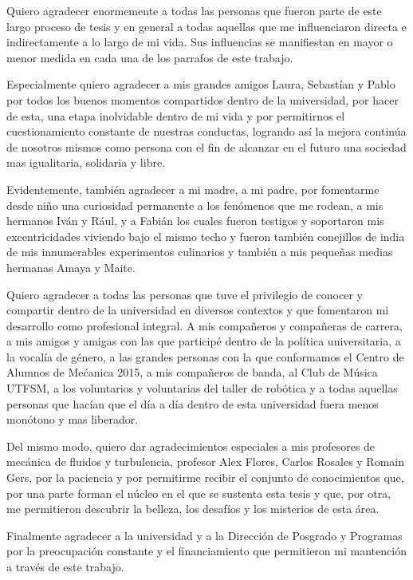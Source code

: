 
Quiero agradecer enormemente a todas las personas que fueron parte de este largo proceso de tesis y en general a todas aquellas que me influenciaron directa e indirectamente a lo largo de mi vida. Sus influencias se manifiestan en mayor o menor medida en cada una de los parrafos de este trabajo. 

Especialmente quiero agradecer a mis grandes amigos Laura, Sebastían y Pablo por todos los buenos momentos compartidos dentro de la universidad, por hacer de esta, una etapa inolvidable dentro de mi vida y por permitirnos el cuestionamiento constante de nuestras conductas, logrando así la mejora continúa de nosotros mismos como persona con el fin de alcanzar en el futuro una sociedad mas igualitaria, solidaria y libre. 

Evidentemente, también agradecer a mi madre, a mi padre, por fomentarme desde niño una curiosidad permanente a los fenómenos que me rodean, a mis hermanos Iván y Rául, y a Fabián los cuales fueron testigos y soportaron mis excentricidades viviendo bajo el mismo techo y fueron también conejillos de india de mis innumerables experimentos culinarios y también a mis pequeñas medias hermanas Amaya y Maite.

Quiero agradecer a todas las personas que tuve el privilegio de conocer y compartir dentro de la universidad en diversos contextos y que fomentaron mi desarrollo como profesional integral. A mis compañeros y compañeras de carrera, a mis amigos y amigas con las que participé dentro de la política universitaria, a la vocalía de género, a las grandes personas con la que conformamos el Centro de Alumnos de Mećanica 2015, a mis compañeros de banda, al Club de Música UTFSM, a los voluntarios y voluntarias del taller de robótica y a todas aquellas personas que hacían que el día a día dentro de esta universidad fuera menos monótono y mas liberador. 

Del mismo modo, quiero dar agradecimientos especiales a mis profesores de mecánica de fluidos y turbulencia, profesor Alex Flores, Carlos Rosales y Romain Gers, por la paciencia y por permitirme recibir el conjunto de conocimientos que, por una parte forman el núcleo en el que se sustenta esta tesis y que, por otra, me permitieron descubrir la belleza, los desafíos y los misterios de esta área.

Finalmente agradecer a la universidad y a la Dirección de Posgrado y Programas por la preocupación constante y el financiamiento que permitieron mi mantención a través de este trabajo.
